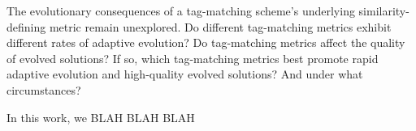 The evolutionary consequences of a tag-matching scheme's underlying similarity-defining metric remain unexplored.
Do different tag-matching metrics exhibit different rates of adaptive evolution?
Do tag-matching metrics affect the quality of evolved solutions?
If so, which tag-matching metrics best promote rapid adaptive evolution and high-quality evolved solutions?
And under what circumstances?

In this work, we BLAH BLAH BLAH
